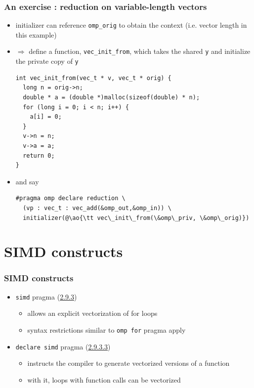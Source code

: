 \documentclass[12pt,dvipdfmx]{beamer}
\newcommand{\sectionompsimd}{{\href{https://www.openmp.org/spec-html/5.0/openmpsu42.html\#x65-1390002.9.3}{2.9.3}}}
\newcommand{\sectionompdeclaresimd}{{\href{https://www.openmp.org/spec-html/5.0/openmpsu42.html\#x65-1390002.9.3.3}{2.9.3.3}}}
\newcommand{\ao}[1]{{\color{blue}#1}}
\begin{document}
\begin{frame}[fragile]
\frametitle{An exercise : reduction on variable-length vectors}
\begin{itemize}
\item initializer can reference {\tt omp\_orig} to obtain the context
  (i.e. vector length in this example)

\item $\Rightarrow$ define a function, {\tt vec\_init\_from},
  which takes the shared {\tt y} and initialize the private copy of {\tt y}
  
\begin{lstlisting}
int vec_init_from(vec_t * v, vec_t * orig) {
  long n = orig->n;
  double * a = (double *)malloc(sizeof(double) * n);
  for (long i = 0; i < n; i++) {
    a[i] = 0;
  }
  v->n = n;
  v->a = a;
  return 0;
}
\end{lstlisting}

\item and say
\begin{lstlisting}
#pragma omp declare reduction \
  (vp : vec_t : vec_add(&omp_out,&omp_in)) \
  initializer(@\ao{\tt vec\_init\_from(\&omp\_priv, \&omp\_orig)})
\end{lstlisting}
\end{itemize}
\end{frame}

\section{SIMD constructs}

\begin{frame}[fragile]
\frametitle{SIMD constructs}
\begin{itemize}
\item {\tt simd} pragma (\sectionompsimd)
  \begin{itemize}
  \item allows an explicit vectorization of for loops
  \item syntax restrictions similar to {\tt omp for} pragma apply
  \end{itemize}

\item {\tt declare simd} pragma (\sectionompdeclaresimd)
  \begin{itemize}
  \item instructs the compiler to generate vectorized versions of a function
  \item with it, loops with function calls can be vectorized
  \end{itemize}
\end{itemize}
\end{frame}
\end{document}
